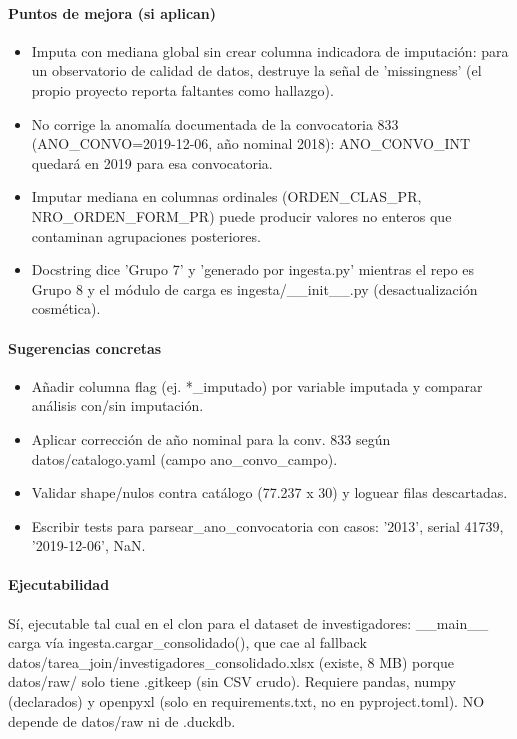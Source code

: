 \paragraph{Puntos de mejora (si aplican)}
\begin{itemize}
  \item Imputa con mediana global sin crear columna indicadora de imputación: para un observatorio de calidad de datos, destruye la señal de 'missingness' (el propio proyecto reporta faltantes como hallazgo).
  \item No corrige la anomalía documentada de la convocatoria 833 (ANO\_CONVO=2019-12-06, año nominal 2018): ANO\_CONVO\_INT quedará en 2019 para esa convocatoria.
  \item Imputar mediana en columnas ordinales (ORDEN\_CLAS\_PR, NRO\_ORDEN\_FORM\_PR) puede producir valores no enteros que contaminan agrupaciones posteriores.
  \item Docstring dice 'Grupo 7' y 'generado por ingesta.py' mientras el repo es Grupo 8 y el módulo de carga es ingesta/\_\_init\_\_.py (desactualización cosmética).
\end{itemize}

\paragraph{Sugerencias concretas}
\begin{itemize}
  \item Añadir columna flag (ej. *\_imputado) por variable imputada y comparar análisis con/sin imputación.
  \item Aplicar corrección de año nominal para la conv. 833 según datos/catalogo.yaml (campo ano\_convo\_campo).
  \item Validar shape/nulos contra catálogo (77.237 x 30) y loguear filas descartadas.
  \item Escribir tests para parsear\_ano\_convocatoria con casos: '2013', serial 41739, '2019-12-06', NaN.
\end{itemize}

\paragraph{Ejecutabilidad}
Sí, ejecutable tal cual en el clon para el dataset de investigadores: \_\_main\_\_ carga vía ingesta.cargar\_consolidado(), que cae al fallback datos/tarea\_join/investigadores\_consolidado.xlsx (existe, 8 MB) porque datos/raw/ solo tiene .gitkeep (sin CSV crudo). Requiere pandas, numpy (declarados) y openpyxl (solo en requirements.txt, no en pyproject.toml). NO depende de datos/raw ni de .duckdb.

